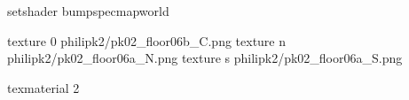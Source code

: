 setshader bumpspecmapworld

texture 0 philipk2/pk02_floor06b_C.png
texture n philipk2/pk02_floor06a_N.png
texture s philipk2/pk02_floor06a_S.png

texmaterial 2
